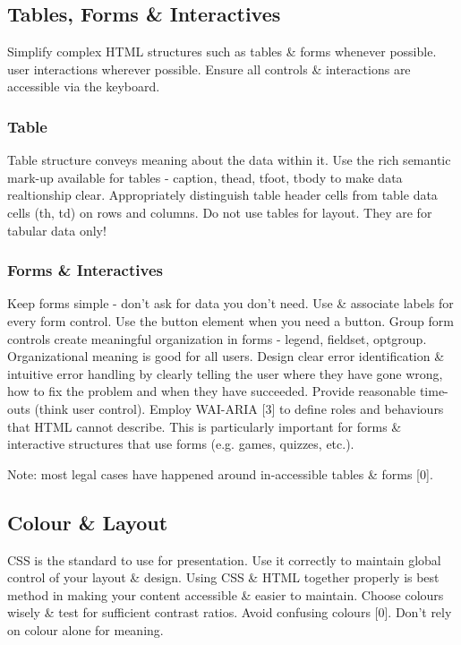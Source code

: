 \documentclass{acm_proc_article-sp}
\begin{document}
\subsection{Tables, Forms \& Interactives}
Simplify complex HTML structures such as tables \& forms whenever possible. user interactions wherever possible. Ensure all controls \& interactions are accessible via the keyboard.
\subsubsection{Table}
Table structure conveys meaning about the data within it. Use the rich semantic mark-up available for tables - caption, thead, tfoot, tbody to make data realtionship clear. Appropriately distinguish table header cells from table data cells (th, td) on rows and columns. Do not use tables for layout. They are for tabular data only!

\subsubsection{Forms \& Interactives}
Keep forms simple - don't ask for data you don't need. Use \& associate labels for every form control. Use the button element when you need a button. Group form controls create meaningful organization in forms - legend, fieldset, optgroup. Organizational meaning is good for all users. Design clear error identification \& intuitive error handling by clearly telling the user where they have gone wrong, how to fix the problem and when they have succeeded. Provide reasonable time-outs (think user control). Employ WAI-ARIA [3] to define roles and behaviours that HTML cannot describe. This is particularly important for forms \& interactive structures that use forms (e.g. games, quizzes, etc.).

Note: most legal cases have happened around in-accessible tables \& forms [0].

\subsection{Colour \& Layout}
CSS is the standard to use for presentation. Use it correctly to maintain global control of your layout \& design. Using CSS \& HTML together properly is best method in making your content accessible \& easier to maintain. Choose colours wisely \& test for sufficient contrast ratios. Avoid confusing colours [0]. Don't rely on colour alone for meaning.
\end{document}
